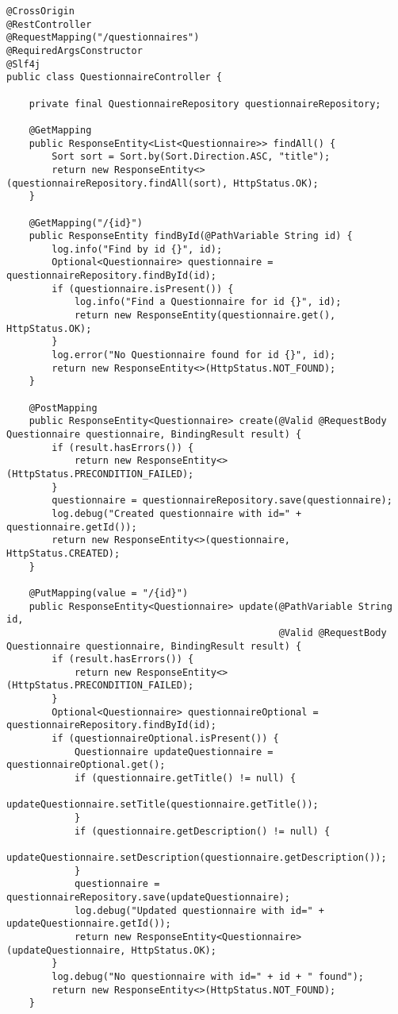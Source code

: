 \begin{verbatim}
@CrossOrigin
@RestController
@RequestMapping("/questionnaires")
@RequiredArgsConstructor
@Slf4j
public class QuestionnaireController {

    private final QuestionnaireRepository questionnaireRepository;
    
    @GetMapping
    public ResponseEntity<List<Questionnaire>> findAll() {
        Sort sort = Sort.by(Sort.Direction.ASC, "title");
        return new ResponseEntity<>(questionnaireRepository.findAll(sort), HttpStatus.OK);
    }

    @GetMapping("/{id}")
    public ResponseEntity findById(@PathVariable String id) {
        log.info("Find by id {}", id);
        Optional<Questionnaire> questionnaire = questionnaireRepository.findById(id);
        if (questionnaire.isPresent()) {
            log.info("Find a Questionnaire for id {}", id);
            return new ResponseEntity(questionnaire.get(), HttpStatus.OK);
        }
        log.error("No Questionnaire found for id {}", id);
        return new ResponseEntity<>(HttpStatus.NOT_FOUND);
    }

    @PostMapping
    public ResponseEntity<Questionnaire> create(@Valid @RequestBody Questionnaire questionnaire, BindingResult result) {
        if (result.hasErrors()) {
            return new ResponseEntity<>(HttpStatus.PRECONDITION_FAILED);
        }
        questionnaire = questionnaireRepository.save(questionnaire);
        log.debug("Created questionnaire with id=" + questionnaire.getId());
        return new ResponseEntity<>(questionnaire, HttpStatus.CREATED);
    }

    @PutMapping(value = "/{id}")
    public ResponseEntity<Questionnaire> update(@PathVariable String id,
                                                @Valid @RequestBody Questionnaire questionnaire, BindingResult result) {
        if (result.hasErrors()) {
            return new ResponseEntity<>(HttpStatus.PRECONDITION_FAILED);
        }
        Optional<Questionnaire> questionnaireOptional = questionnaireRepository.findById(id);
        if (questionnaireOptional.isPresent()) {
            Questionnaire updateQuestionnaire = questionnaireOptional.get();
            if (questionnaire.getTitle() != null) {
                updateQuestionnaire.setTitle(questionnaire.getTitle());
            }
            if (questionnaire.getDescription() != null) {
                updateQuestionnaire.setDescription(questionnaire.getDescription());
            }
            questionnaire = questionnaireRepository.save(updateQuestionnaire);
            log.debug("Updated questionnaire with id=" + updateQuestionnaire.getId());
            return new ResponseEntity<Questionnaire>(updateQuestionnaire, HttpStatus.OK);
        }
        log.debug("No questionnaire with id=" + id + " found");
        return new ResponseEntity<>(HttpStatus.NOT_FOUND);
    }


\end{verbatim}
